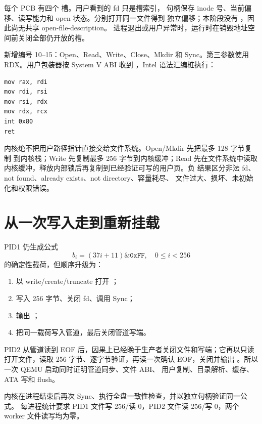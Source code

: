 每个 PCB 有四个  槽。用户看到的 fd 只是槽索引，
句柄保存 inode 号、当前偏移、读写能力和 open 状态。分别打开同一文件得到
独立偏移；本阶段没有 ，因此尚无共享 open-file-description。
进程退出或用户异常时，运行时在销毁地址空间前关闭全部仍开放的槽。

 新增编号 10--15：Open、Read、Write、Close、Mkdir 和
Sync。第三参数使用 RDX。用户包装器按 System V ABI 收到
，Intel 语法汇编桩执行：

\begin{lstlisting}[language={[x86masm]Assembler}]
mov rax, rdi
mov rdi, rsi
mov rsi, rdx
mov rdx, rcx
int 0x80
ret
\end{lstlisting}

内核绝不把用户路径指针直接交给文件系统。Open/Mkdir 先把最多 128 字节复制
到内核栈；Write 先复制最多 256 字节到内核缓冲；Read 先在文件系统中读取
内核缓冲，释放内部锁后再复制到已经验证可写的用户页。负 
结果区分非法 fd、not found、already exists、not directory、容量耗尽、
文件过大、损坏、未初始化和权限错误。

\section{从一次写入走到重新挂载}
PID1 仍生成公式
\[
  b_i=(37i+11)\mathbin{\&}\mathtt{0xFF},\quad 0\le i<256
\]
的确定性载荷，但顺序升级为：

\begin{enumerate}[label=\arabic*.]
  \item 以 write/create/truncate 打开 ；
  \item 写入 256 字节、关闭 fd、调用 Sync；
  \item 输出 ；
  \item 把同一载荷写入管道，最后关闭管道写端。
\end{enumerate}

PID2 从管道读到 EOF 后，因果上已经晚于生产者关闭文件和写端；它再以只读
打开文件，读取 256 字节、逐字节验证，再读一次确认 EOF，关闭并输出
。所以一次 QEMU 启动同时证明管道同步、文件 ABI、
用户复制、目录解析、缓存、ATA 写和 flush。

内核在进程结束后再次 Sync、执行全盘一致性检查，并以独立句柄验证同一公式。
每进程统计要求 PID1 文件写 256/读 0，PID2 文件读 256/写 0，两个 worker
文件读写均为零。

